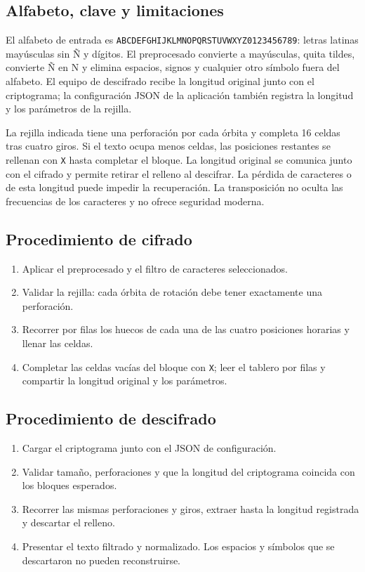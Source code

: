 \documentclass[11pt,a4paper]{article}
\begin{document}
\subsection{Alfabeto, clave y limitaciones}
El alfabeto de entrada es \texttt{ABCDEFGHIJKLMNOPQRSTUVWXYZ0123456789}: letras latinas mayúsculas sin Ñ y dígitos. El preprocesado convierte a mayúsculas, quita tildes, convierte Ñ en N y elimina espacios, signos y cualquier otro símbolo fuera del alfabeto. El equipo de descifrado recibe la longitud original junto con el criptograma; la configuración JSON de la aplicación también registra la longitud y los parámetros de la rejilla.

La rejilla indicada tiene una perforación por cada órbita y completa 16 celdas tras cuatro giros. Si el texto ocupa menos celdas, las posiciones restantes se rellenan con \texttt{X} hasta completar el bloque. La longitud original se comunica junto con el cifrado y permite retirar el relleno al descifrar. La pérdida de caracteres o de esta longitud puede impedir la recuperación. La transposición no oculta las frecuencias de los caracteres y no ofrece seguridad moderna.

\subsection{Procedimiento de cifrado}
\begin{enumerate}
  \item Aplicar el preprocesado y el filtro de caracteres seleccionados.
  \item Validar la rejilla: cada órbita de rotación debe tener exactamente una perforación.
  \item Recorrer por filas los huecos de cada una de las cuatro posiciones horarias y llenar las celdas.
  \item Completar las celdas vacías del bloque con \texttt{X}; leer el tablero por filas y compartir la longitud original y los parámetros.
\end{enumerate}

\subsection{Procedimiento de descifrado}
\begin{enumerate}
  \item Cargar el criptograma junto con el JSON de configuración.
  \item Validar tamaño, perforaciones y que la longitud del criptograma coincida con los bloques esperados.
  \item Recorrer las mismas perforaciones y giros, extraer hasta la longitud registrada y descartar el relleno.
  \item Presentar el texto filtrado y normalizado. Los espacios y símbolos que se descartaron no pueden reconstruirse.
\end{enumerate}
\end{document}
